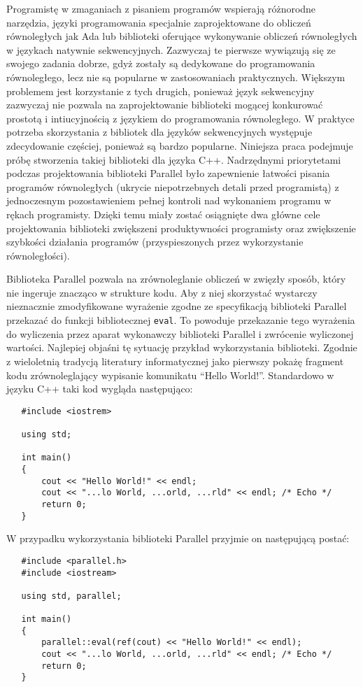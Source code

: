   Programistę w zmaganiach z pisaniem programów wspierają różnorodne narzędzia, języki programowania specjalnie zaprojektowane do obliczeń równoległych jak Ada lub biblioteki oferujące wykonywanie obliczeń równoległych
  w językach natywnie sekwencyjnych.
  Zazwyczaj te pierwsze wywiązują się ze swojego zadania dobrze, gdyż zostały są dedykowane do programowania równoległego, lecz nie są popularne w zastosowaniach praktycznych.
  Większym problemem jest korzystanie z tych drugich, ponieważ język sekwencyjny zazwyczaj nie pozwala na zaprojektowanie biblioteki mogącej konkurować prostotą i intiucyjnością z językiem do programowania równoległego.
  W praktyce potrzeba skorzystania z bibliotek dla języków sekwencyjnych występuje zdecydowanie częściej, ponieważ są bardzo popularne.
  Niniejsza praca podejmuje próbę stworzenia takiej biblioteki dla języka C++.
  Nadrzędnymi priorytetami podczas projektowania biblioteki Parallel było zapewnienie łatwości pisania programów równoległych (ukrycie niepotrzebnych detali przed programistą) z jednoczesnym pozostawieniem pełnej kontroli 
  nad wykonaniem programu w rękach programisty. 
  Dzięki temu miały zostać osiągnięte dwa główne cele projektowania biblioteki zwiększeni produktywności programisty oraz zwiększenie szybkości działania programów (przyspieszonych przez wykorzystanie równoległości).
  
  Biblioteka Parallel pozwala na zrównoleglanie obliczeń w zwięzły sposób, który nie ingeruje znacząco w strukture kodu.
  Aby z niej skorzystać wystarczy nieznacznie zmodyfikowane wyrażenie zgodne ze specyfikacją biblioteki Parallel przekazać do funkcji bibliotecznej \verb|eval|.
  To powoduje przekazanie tego wyrażenia do wyliczenia przez aparat wykonawczy biblioteki Parallel i zwrócenie wyliczonej wartości.
  Najlepiej objaśni tę sytuację przykład wykorzystania biblioteki.
  Zgodnie z wieloletnią tradycją literatury informatycznej jako pierwszy pokażę fragment kodu zrównoleglający wypisanie komunikatu ``Hello World!''.
  Standardowo w języku C++ taki kod wygląda następująco:
  \begin{lstlisting}
   #include <iostrem>
   
   using std;
   
   int main()
   {
       cout << "Hello World!" << endl;
       cout << "...lo World, ...orld, ...rld" << endl; /* Echo */
       return 0;
   }
  \end{lstlisting}
  W przypadku wykorzystania biblioteki Parallel przyjmie on następującą postać:
  \begin{lstlisting}
   #include <parallel.h>
   #include <iostream>
   
   using std, parallel;
   
   int main()
   {
       parallel::eval(ref(cout) << "Hello World!" << endl);
       cout << "...lo World, ...orld, ...rld" << endl; /* Echo */
       return 0;
   }
  \end{lstlisting}
  
